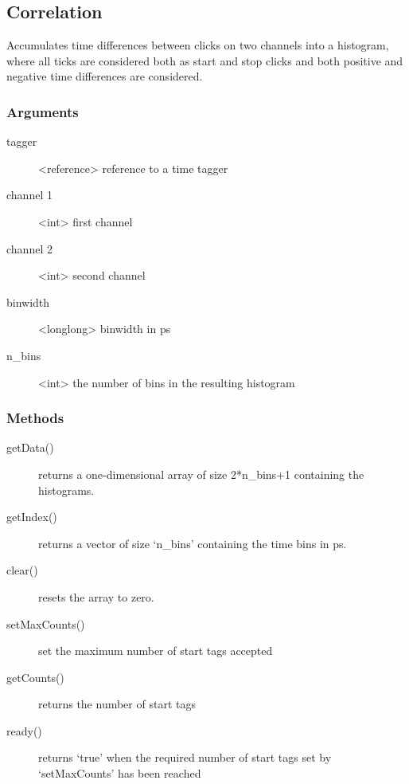 \documentclass[letterpaper,10pt,english]{sphinxmanual}
\begin{document}
\subsection{Correlation}
\label{sections/api:correlation}
Accumulates time differences between clicks on two channels into
a histogram, where all ticks are considered both as start and stop
clicks and both positive and negative time differences are considered.


\subsubsection{Arguments}
\label{sections/api:id8}\begin{description}
\item[{tagger}] \leavevmode
\textless{}reference\textgreater{} reference to a time tagger

\item[{channel 1}] \leavevmode
\textless{}int\textgreater{} first channel

\item[{channel 2}] \leavevmode
\textless{}int\textgreater{} second channel

\item[{binwidth}] \leavevmode
\textless{}longlong\textgreater{} binwidth in ps

\item[{n\_bins}] \leavevmode
\textless{}int\textgreater{} the number of bins in the resulting histogram

\end{description}


\subsubsection{Methods}
\label{sections/api:id9}\begin{description}
\item[{getData()}] \leavevmode
returns a one-dimensional array of size 2*n\_bins+1 containing the histograms.

\item[{getIndex()}] \leavevmode
returns a vector of size `n\_bins' containing the time bins in ps.

\item[{clear()}] \leavevmode
resets the array to zero.

\item[{setMaxCounts()}] \leavevmode
set the maximum number of start tags accepted

\item[{getCounts()}] \leavevmode
returns the number of start tags

\item[{ready()}] \leavevmode
returns `true' when the required number of start tags set by `setMaxCounts' has been reached

\end{description}
\end{document}
